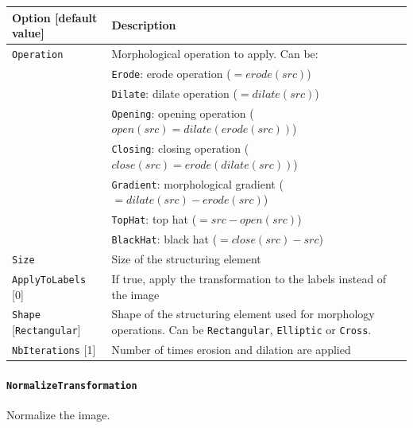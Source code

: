 \documentclass[a4paper,11pt,oneside]{article}
\begin{document}
\begin{center}
 \begin{tabular}{| p{5cm} | p{10cm} | }
 \hline
 Option [default value] & Description\\
 \hline\hline
  \cellcolor{requiredcolor}\lstinline!Operation! & Morphological operation to
  apply. Can be:\\
   & \lstinline!Erode!: erode operation ($=erode(src)$) \\
   & \lstinline!Dilate!: dilate operation ($=dilate(src)$) \\
   & \lstinline!Opening!: opening operation ($open(src)=dilate(erode(src))$) \\
   & \lstinline!Closing!: closing operation ($close(src)=erode(dilate(src))$) \\
   & \lstinline!Gradient!: morphological gradient ($=dilate(src)-erode(src)$) \\
   & \lstinline!TopHat!: top hat ($=src-open(src)$) \\
   & \lstinline!BlackHat!: black hat ($=close(src)-src$) \\
  \cellcolor{requiredcolor}\lstinline!Size! & Size of the structuring element \\
  \lstinline!ApplyToLabels! [0] & If true, apply the transformation to the
  labels instead of the image \\
  \lstinline!Shape! [\lstinline!Rectangular!] & Shape of the structuring element
   used for morphology operations. Can be \lstinline!Rectangular!,
   \lstinline!Elliptic! or \lstinline!Cross!. \\
  \lstinline!NbIterations! [1] & Number of times erosion and dilation are
  applied \\
 \hline
\end{tabular}
\end{center}


\paragraph{\texorpdfstring{\lstinline[basicstyle=\ttfamily\bfseries]!NormalizeTransformation!}{NormalizeTransformation}}
Normalize the image.
\end{document}
